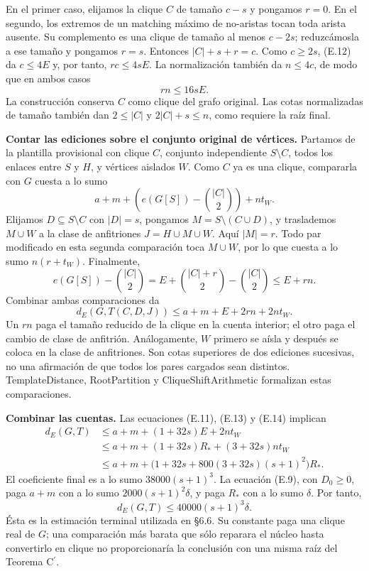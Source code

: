 \documentclass[spanish,11pt,a4paper]{article}
\begin{document}
En el primer caso, elijamos la clique \(C\) de tamaño \(c-s\) y pongamos \(r=0\). En el segundo, los extremos de un matching máximo de no-aristas tocan toda arista ausente. Su complemento es una clique de tamaño al menos \(c-2s\); reduzcámosla a ese tamaño y pongamos \(r=s\). Entonces \(|C|+s+r=c\). Como \(c\ge2s\), (E.12) da \(c\le4E\) y, por tanto, \(rc\le4sE\). La normalización también da \(n\le4c\), de modo que en ambos casos \[
rn\le16sE.
\tag{E.13}
\] La construcción conserva \(C\) como clique del grafo original. Las cotas normalizadas de tamaño también dan \(2\le|C|\) y \(2|C|+s\le n\), como requiere la raíz final.

\textbf{Contar las ediciones sobre el conjunto original de vértices.} Partamos de la plantilla provisional con clique \(C\), conjunto independiente \(S\setminus C\), todos los enlaces entre \(S\) y \(H\), y vértices aislados \(W\). Como \(C\) ya es una clique, compararla con \(G\) cuesta a lo sumo \[
a+m+\left(e(G[S])-\binom{|C|}{2}\right)+nt_W.
\] Elijamos \(D\subseteq S\setminus C\) con \(|D|=s\), pongamos \(M=S\setminus(C\cup D)\), y traslademos \(M\cup W\) a la clase de anfitriones \(J=H\cup M\cup W\). Aquí \(|M|=r\). Todo par modificado en esta segunda comparación toca \(M\cup W\), por lo que cuesta a lo sumo \(n(r+t_W)\). Finalmente, \[
e(G[S])-\binom{|C|}{2}
=E+\binom{|C|+r}{2}-\binom{|C|}{2}
\le E+rn.
\] Combinar ambas comparaciones da \[
d_E(G,T(C,D,J))\le a+m+E+2rn+2nt_W.
\tag{E.14}
\] Un \(rn\) paga el tamaño reducido de la clique en la cuenta interior; el otro paga el cambio de clase de anfitrión. Análogamente, \(W\) primero se aísla y después se coloca en la clase de anfitriones. Son cotas superiores de dos ediciones sucesivas, no una afirmación de que todos los pares cargados sean distintos. {\ttfamily\small TemplateDist\discretionary{\hbox{\ensuremath{\hookrightarrow}}}{}{}ance}, {\ttfamily\small RootPartitio\discretionary{\hbox{\ensuremath{\hookrightarrow}}}{}{}n} y {\ttfamily\small CliqueShiftA\discretionary{\hbox{\ensuremath{\hookrightarrow}}}{}{}rithmetic} formalizan estas comparaciones.

\textbf{Combinar las cuentas.} Las ecuaciones (E.11), (E.13) y (E.14) implican \[
\begin{aligned}
d_E(G,T)&\le a+m+(1+32s)E+2nt_W\\
&\le a+m+(1+32s)R_*+(3+32s)nt_W\\
&\le a+m+\bigl(1+32s+800(3+32s)(s+1)^2\bigr)R_*.
\end{aligned}
\] El coeficiente final es a lo sumo \(38000(s+1)^3\). La ecuación (E.9), con \(D_0\ge0\), paga \(a+m\) con a lo sumo \(2000(s+1)^2\delta\), y paga \(R_*\) con a lo sumo \(\delta\). Por tanto, \[
d_E(G,T)\le40000(s+1)^3\delta.
\] Ésta es la estimación terminal utilizada en §6.6. Su constante paga una clique real de \(G\); una comparación más barata que sólo reparara el núcleo hasta convertirlo en clique no proporcionaría la conclusión con una misma raíz del Teorema \texorpdfstring{C\ensuremath{^{\prime}}}{C'}.
\end{document}
